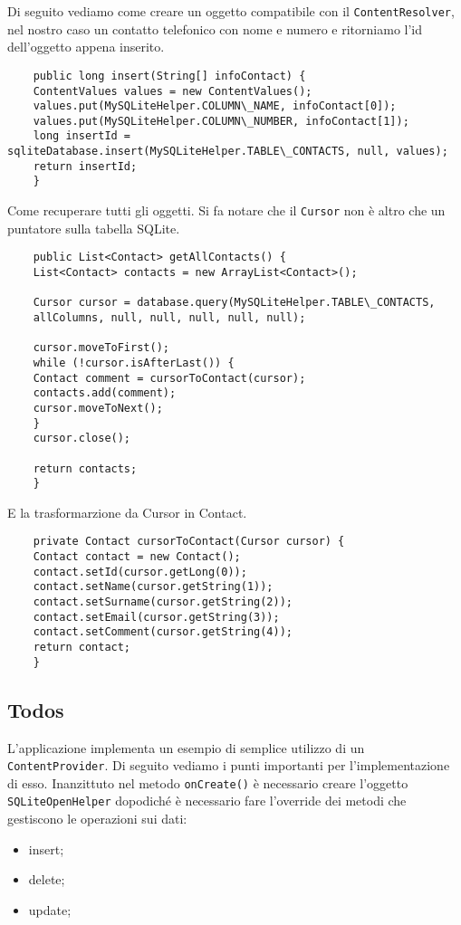 \begin{itemize}
	Di seguito vediamo come creare un oggetto compatibile con il \lstinline|ContentResolver|, nel nostro caso un contatto telefonico con nome e numero e ritorniamo l'id dell'oggetto appena inserito.
	\begin{lstlisting}
	public long insert(String[] infoContact) {
	ContentValues values = new ContentValues();
	values.put(MySQLiteHelper.COLUMN\_NAME, infoContact[0]);
	values.put(MySQLiteHelper.COLUMN\_NUMBER, infoContact[1]);
	long insertId = sqliteDatabase.insert(MySQLiteHelper.TABLE\_CONTACTS, null, values);
	return insertId;
	}
	\end{lstlisting}
	
	Come recuperare tutti gli oggetti. Si fa notare che il \lstinline|Cursor| non è altro che un puntatore sulla tabella SQLite.
	\begin{lstlisting}
	public List<Contact> getAllContacts() {
	List<Contact> contacts = new ArrayList<Contact>();
	
	Cursor cursor = database.query(MySQLiteHelper.TABLE\_CONTACTS,
	allColumns, null, null, null, null, null);
	
	cursor.moveToFirst();
	while (!cursor.isAfterLast()) {
	Contact comment = cursorToContact(cursor);
	contacts.add(comment);
	cursor.moveToNext();
	}
	cursor.close();
	
	return contacts;
	}
	\end{lstlisting}
	
	E la trasformarzione da Cursor in Contact.
	\begin{lstlisting}
	private Contact cursorToContact(Cursor cursor) {
	Contact contact = new Contact();
	contact.setId(cursor.getLong(0));
	contact.setName(cursor.getString(1));
	contact.setSurname(cursor.getString(2));
	contact.setEmail(cursor.getString(3));
	contact.setComment(cursor.getString(4));
	return contact;
	}
	\end{lstlisting}
	
	
	\subsection{Todos}
	L'applicazione implementa un esempio di semplice utilizzo di un \lstinline|ContentProvider|. Di seguito vediamo i punti importanti per l'implementazione di esso. Inanzittuto nel metodo \lstinline|onCreate()| è necessario creare l'oggetto \lstinline|SQLiteOpenHelper| dopodiché è necessario fare l'override dei metodi che gestiscono le operazioni sui dati:
	\begin{itemize}
		\item insert;
		\item delete;
		\item update;
	\end{itemize}
	

\end{itemize}
